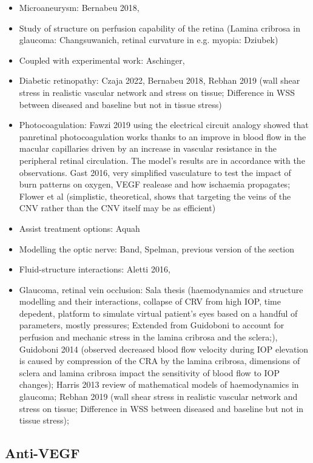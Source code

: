 \documentclass[12pt,a4paper]{journal}
\begin{document}
\begin{itemize}
\item Microaneurysm: Bernabeu 2018,  
\item Study of structure on perfusion capability of the retina (Lamina cribrosa in glaucoma: Changsuwanich, retinal curvature in e.g. myopia: Dziubek)
\item Coupled with experimental work: Aschinger,
\item Diabetic retinopathy: Czaja 2022, Bernabeu 2018, Rebhan 2019 (wall shear stress in realistic vascular network and stress on tissue; Difference in WSS between diseased and baseline but not in tissue stress)
\item Photocoagulation: Fawzi 2019 using the electrical circuit analogy showed that panretinal photocoagulation works thanks to an improve in blood flow in the macular capillaries driven by an increase in vascular resistance in the peripheral retinal circulation. The model's results are in accordance with the observations. Gast 2016, very simplified vasculature to test the impact of burn patterns on oxygen, VEGF realease and how ischaemia propagates; Flower et al (simplistic, theoretical, shows that targeting the veins of the CNV rather than the CNV itself may be as efficient)
\item Assist treatment options: Aquah
\item Modelling the optic nerve: Band, Spelman, previous version of the section
\item Fluid-structure interactions: Aletti 2016, 
\item Glaucoma, retinal vein occlusion: Sala thesis (haemodynamics and structure modelling and their interactions, collapse of CRV from high IOP, time depedent, platform to simulate virtual patient's eyes based on a handful of parameters, mostly pressures; Extended from Guidoboni to account for perfusion and mechanic stress in the lamina cribrosa and the sclera;), Guidoboni 2014 (observed decreased blood flow velocity during IOP elevation is caused by compression of the CRA by the lamina cribrosa, dimensions of sclera and lamina cribrosa impact the sensitivity of blood flow to IOP changes); Harris 2013 review of mathematical models of haemodynamics in glaucoma; Rebhan 2019 (wall shear stress in realistic vascular network and stress on tissue; Difference in WSS between diseased and baseline but not in tissue stress);  
\end{itemize}
\newpage

\subsection*{Anti-VEGF}
\end{document}
